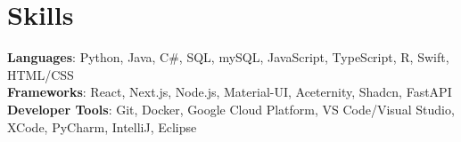 \documentclass[letterpaper,11pt]{article}
\begin{document}
\section{Skills}
 \begin{itemize}[leftmargin=0.15in, label={}]
    \small{\item{
     \textbf{Languages}{: Python, Java, C#, SQL, mySQL, JavaScript, TypeScript, R, Swift, HTML/CSS} \\
     \textbf{Frameworks}{: React, Next.js, Node.js, Material-UI, Aceternity, Shadcn, FastAPI} \\
     \textbf{Developer Tools}{: Git, Docker, Google Cloud Platform, VS Code/Visual Studio, XCode, PyCharm, IntelliJ, Eclipse} \\
    }}
 \end{itemize}


\end{document}
